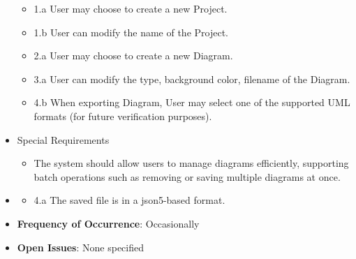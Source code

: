 \documentclass[12pt]{article}
\begin{document}
\begin{itemize}
\begin{itemize}
            \item 1.a User may choose to create a new Project.
            \item 1.b User can modify the name of the Project.
            \item 2.a User may choose to create a new Diagram.
            \item 3.a User can modify the type, background color, filename of the Diagram.
            \item 4.b When exporting Diagram, User may select one of the supported UML formats (for future verification purposes).
        \end{itemize}
        \item Special Requirements
        \begin{itemize}
            \item The system should allow users to manage diagrams efficiently, supporting batch operations such as removing or saving multiple diagrams at once.
        \end{itemize}
        \item {}
        \begin{itemize}
            \item 4.a The saved file is in a json5-based format.
        \end{itemize}
        \item \textbf{Frequency of Occurrence}: Occasionally
        \item \textbf{Open Issues}: None specified
    \end{itemize}
\end{document}
